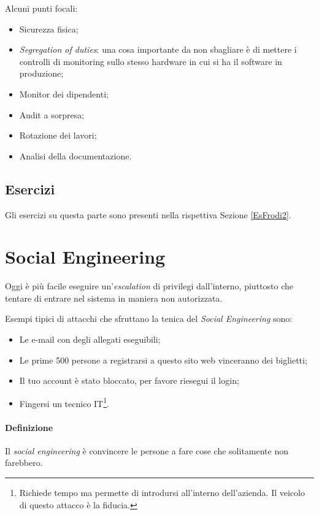 Alcuni punti focali:
\begin{itemize}
  \item Sicurezza fisica;
  \item \textit{Segregation of duties}: una cosa importante da non sbagliare è
  di mettere i controlli di monitoring
  sullo stesso hardware in cui si ha il software in produzione;
  \item Monitor dei dipendenti;
  \item Audit a sorpresa;
  \item Rotazione dei lavori;
  \item Analisi della documentazione.
\end{itemize}

\subsection{Esercizi}

Gli esercizi su questa parte sono presenti nella rispettiva Sezione
\ref{EsFrodi2}.


\section{Social Engineering}

Oggi è più facile eseguire un'\textit{escalation} di privilegi dall'interno,
piuttosto che tentare di entrare nel sistema in maniera non autorizzata.

Esempi tipici di attacchi che sfruttano la tenica del
\textit{Social Engineering} sono:
\begin{itemize}
  \item Le e-mail con degli allegati eseguibili;
  \item Le prime 500 persone a registrarsi a questo sito web vinceranno dei
  biglietti;
  \item Il tuo account è stato bloccato, per favore riesegui il login;
  \item Fingersi un tecnico IT\footnote{Richiede tempo ma permette di
introdursi all'interno dell'azienda. Il veicolo di questo attacco è la
fiducia.}.
\end{itemize}

\paragraph*{Definizione} Il \textit{social engineering} è convincere le persone
a fare cose che solitamente non farebbero.

